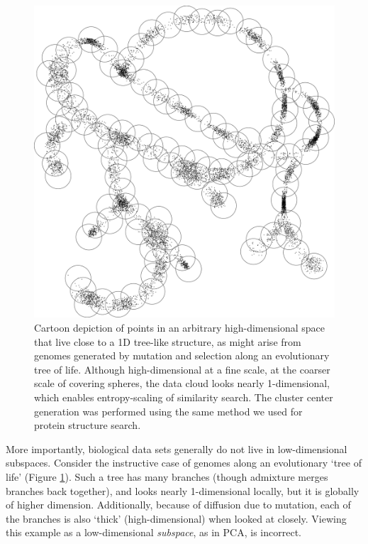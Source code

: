 \documentclass[review,preprint,12pt]{elsarticle}
\theoremstyle{definition}
\theoremstyle{remark}
\numberwithin{equation}{section}
\begin{document}
\begin{figure}[p]
    \vspace{-5em}
    \centering
    \centerline{\includegraphics[width=8in]{assets/treepoints/treepoints2D_clusters.png}}
    \caption{Cartoon depiction of points in an arbitrary high-dimensional space that live close to a 1D tree-like structure, as might arise from genomes generated by mutation and selection along an evolutionary tree of life. 
Although high-dimensional at a fine scale, at the coarser scale of covering spheres, the data cloud looks nearly 1-dimensional, which enables entropy-scaling of similarity search. The cluster center generation was performed using the same method we used for protein structure search.}
    \label{fig:tree}
\end{figure}

More importantly, biological data sets generally do not live in low-dimensional subspaces.
Consider the instructive case of genomes along an evolutionary `tree of life' (Figure \ref{fig:tree}).
Such a tree has many branches (though admixture merges branches back together),
and looks nearly 1-dimensional locally, but it is globally of higher dimension.
Additionally, because of diffusion due to mutation, each of the branches is also `thick' (high-dimensional) when looked at closely.
Viewing this example as a low-dimensional \textit{subspace}, as in PCA, is 
incorrect.
\end{document}
